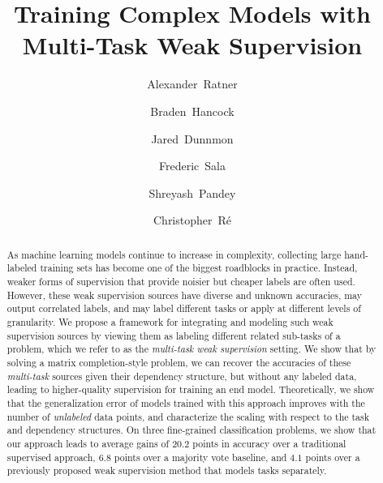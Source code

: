 \documentclass[letterpaper]{article}
\title{Training Complex Models with Multi-Task Weak Supervision}
\author[$\dagger$]{Alexander~Ratner}
\author[$\dagger$]{Braden~Hancock}
\author[$\dagger$]{Jared~Dunnmon}
\author[$\dagger$]{Frederic~Sala}
\author[$\dagger$]{Shreyash~Pandey}
\author[$\dagger$]{Christopher~R{\'e}}
\affil[$\dagger$]{Department of Computer Science, Stanford University}
\affil[ ]{\footnotesize{\texttt{\{ajratner, bradenjh, jdunnmon, fredsala, shreyash, chrismre\}@stanford.edu}}}
\newcommand{\AvgGainOverGold}[0]{20.2}
\newcommand{\AvgGainOverMV}[0]{6.8}
\newcommand{\AvgGainOverDP}[0]{4.1}
\begin{document}
\maketitle

\newcommand{\figpathA}{fig/LF_example2b_wide.png}
\newcommand{\figwidthA}{\textwidth}
\newcommand{\figpathB}{fig/ontonotes_scaleup_plot_log.pdf}
\newcommand{\figwidthB}{0.5\linewidth}

\newcommand{\versionswitch}[2]{#2}

\begin{abstract}
  

As machine learning models continue to increase in complexity, collecting large hand-labeled training sets has become one of the biggest roadblocks in practice.
Instead, weaker forms of supervision that provide noisier but cheaper labels are often used.
However, these weak supervision sources have diverse and unknown accuracies, may output correlated labels, and may label different tasks or apply at different levels of granularity.
We propose a framework for integrating and modeling such weak supervision sources by viewing them as labeling different related sub-tasks of a problem, which we refer to as the \textit{multi-task weak supervision} setting.
We show that by solving a matrix completion-style problem, we can recover the accuracies of these \textit{multi-task} sources given their dependency structure, but without any labeled data, leading to higher-quality supervision for training an end model.
Theoretically, we show that the generalization error of models trained with this approach improves with the number of \textit{unlabeled} data points, and characterize the scaling with respect to the task and dependency structures.
On three fine-grained classification problems, we show that our approach leads to average gains of $\AvgGainOverGold$ points in accuracy over a traditional supervised approach, $\AvgGainOverMV$ points over a majority vote baseline, and $\AvgGainOverDP$ points over a previously proposed weak supervision method that models tasks separately.
 \end{abstract}
\end{document}
